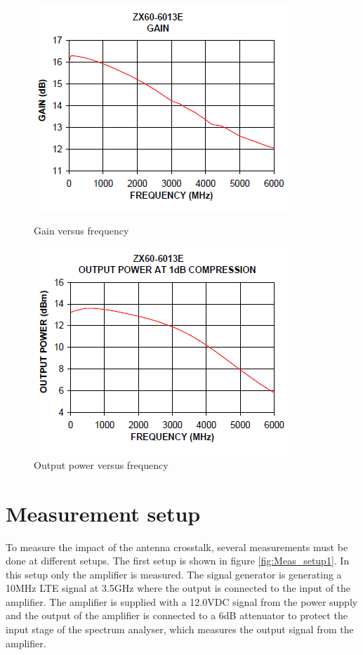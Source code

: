 \begin{figure}[H]
  \centering
  \begin{minipage}[b]{0.5\textwidth}
	\includegraphics[scale = 0.7]{figures/measurement/amp_gain.png}
	\caption{Gain versus frequency}
    \label{fig:amp_gain}
  \end{minipage}
  \hfill
  \begin{minipage}[b]{0.4\textwidth}
\includegraphics[scale = 0.7]{figures/measurement/amp_outpower.png}
\caption{Output power versus frequency}
    \label{fig:amp_outpower}
  \end{minipage}
\end{figure}


\section{Measurement setup} \label{ch_meas_setup}
To measure the impact of the antenna crosstalk, several measurements must be done at different setups. The first setup is shown in figure \ref{fig:Meas_setup1}. In this setup only the amplifier is measured. The signal generator is generating a 10MHz LTE signal at 3.5GHz where the output is connected to the input of the amplifier. The amplifier is supplied with a 12.0VDC signal from the power supply and the output of the amplifier is connected to a 6dB attenuator to protect the input stage of the spectrum analyser, which measures the output signal from the amplifier.   

